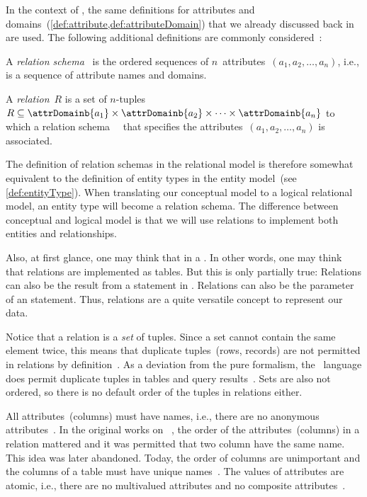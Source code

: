 %
In the context of , the same definitions for attributes and domains~(\cref{def:attribute,def:attributeDomain}) that we already discussed back in  are used.
The following additional definitions are commonly considered~\cite{C1970ARMODFLSDB}:%
%
\begin{definition}%
\sloppy%
\label{def:relationSchema}%
A \emph{relation schema}~ is the ordered sequences of $n$~attributes~$(a_1, a_2, \dots, a_n)$, i.e., is a sequence of attribute names and domains. %
\end{definition}%
\fussy%
%
\begin{definition}[Relation]%
\label{def:rdb:relation}%
A \emph{relation}~$R$ is a set of $n$\nobreakdashes-tuples $R\subseteq\attrDomainb{a_1}\times\attrDomainb{a_2}\times\dots\times\attrDomainb{a_n}$ to which a relation schema~~\cite{SS2005EIDDDFDB:SDWSD2} that specifies the attributes~$(a_1, a_2, \dots, a_n)$ is associated.%
\end{definition}%
%
The definition of relation schemas in the relational model is therefore somewhat equivalent to the definition of entity types in the entity model~(see \cref{def:entityType}).
When translating our conceptual model to a logical relational model, an entity type will become a relation schema.
The difference between conceptual and logical model is that we will use relations to implement both entities and relationships.

Also, at first glance, one may think that  in a \db.
In other words, one may think that relations are implemented as tables.
But this is only partially true:
Relations can also be the result from a  statement in \sql.
Relations can also be the parameter of an  statement.
Thus, relations are a quite versatile concept to represent our data.

Notice that a relation is a \emph{set} of tuples.
Since a set cannot contain the same element twice, this means that duplicate tuples~(rows, records) are not permitted in relations by definition~\cite{C20245YOQ}.
As a deviation from the pure formalism, the \sql\ language does permit duplicate tuples in tables and query results~\cite{C20245YOQ}.
Sets are also not ordered, so there is no default order of the tuples in relations either.

All attributes~(columns) must have names, i.e., there are no anonymous attributes~\cite{S2024D:LDMRMRA}.
In the original works on ~\cite{C1970ARMODFLSDB}, the order of the attributes~(columns) in a relation mattered and it was permitted that two column have the same name.
This idea was later abandoned.
Today, the order of columns are unimportant and the columns of a table must have unique names~\cite{S2024D:LDMRMRA}.
The values of attributes are atomic, i.e., there are no multivalued attributes and no composite attributes~\cite{S2024D:LDMRMRA,SS2005EIDDDFDB:SDLDUTRDM}.

